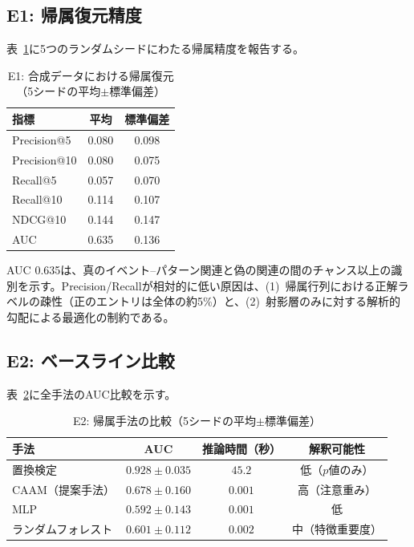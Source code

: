 \documentclass[sigconf,nonacm]{acmart}
\begin{document}
\subsection{E1: 帰属復元精度}

表~\ref{tab:e1}に5つのランダムシードにわたる帰属精度を報告する。

\begin{table}[t]
\caption{E1: 合成データにおける帰属復元（5シードの平均$\pm$標準偏差）}
\label{tab:e1}
\centering
\begin{tabular}{lcc}
\toprule
\textbf{指標} & \textbf{平均} & \textbf{標準偏差} \\
\midrule
Precision@5  & 0.080 & 0.098 \\
Precision@10 & 0.080 & 0.075 \\
Recall@5     & 0.057 & 0.070 \\
Recall@10    & 0.114 & 0.107 \\
NDCG@10      & 0.144 & 0.147 \\
AUC          & 0.635 & 0.136 \\
\bottomrule
\end{tabular}
\end{table}

AUC 0.635は、真のイベント--パターン関連と偽の関連の間のチャンス以上の識別を示す。Precision/Recallが相対的に低い原因は、(1)~帰属行列における正解ラベルの疎性（正のエントリは全体の約5\%）と、(2)~射影層のみに対する解析的勾配による最適化の制約である。

\subsection{E2: ベースライン比較}

表~\ref{tab:e3}に全手法のAUC比較を示す。

\begin{table}[t]
\caption{E2: 帰属手法の比較（5シードの平均$\pm$標準偏差）}
\label{tab:e3}
\centering
\begin{tabular}{lccc}
\toprule
\textbf{手法} & \textbf{AUC} & \textbf{推論時間（秒）} & \textbf{解釈可能性} \\
\midrule
置換検定        & $0.928 \pm 0.035$ & $45.2$ & 低（$p$値のみ）\\
CAAM（提案手法）  & $0.678 \pm 0.160$ & $0.001$ & 高（注意重み）\\
MLP            & $0.592 \pm 0.143$ & $0.001$ & 低 \\
ランダムフォレスト & $0.601 \pm 0.112$ & $0.002$ & 中（特徴重要度）\\
\bottomrule
\end{tabular}
\end{table}
\end{document}
